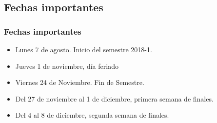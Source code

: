 \subsection{Fechas importantes}
\begin{frame}
\frametitle{Fechas importantes}
\begin{itemize}[<+->]
\item Lunes 7 de agosto. Inicio del semestre 2018-1.
\item Jueves 1 de noviembre, día feriado
\item Viernes 24 de Noviembre. Fin de Semestre.
\item Del 27 de noviembre al 1 de diciembre, primera semana de finales.
\item Del 4 al 8 de diciembre, segunda semana de finales.
\end{itemize}
\end{frame}
